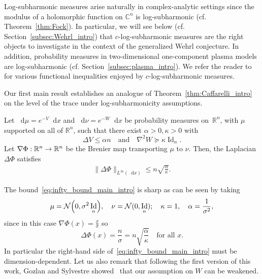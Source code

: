 \documentclass[AHL,Unicode,longabstracts]{cedram}
\newcommand{\R}{\mathbb R}
\newcommand{\C}{\mathbb C}
\DeclareMathOperator{\Id}{Id}
\newcommand{\V}{V}
\newcommand{\W}{W}
\newcommand{\dd}{n}
\newcommand{\conv}{c}
\newcommand{\source}{\mu}
\newcommand{\target}{\nu}
\newcommand{\lsh}{\alpha}
\newcommand{\lc}{\kappa}
\newcommand*\diff{\mathop{}\!\mathrm{d}}
\newcommand{\clN}{\mathcal{N}}
\newcommand{\OT}{\Phi}
\renewcommand*{\to}{\mathchoice{\longrightarrow}{\rightarrow}{\rightarrow}{\rightarrow}}
\let\originalleft\left
\let\originalright\right
\renewcommand{\left}{\mathopen{}\mathclose\bgroup\originalleft}
\renewcommand{\right}{\aftergroup\egroup\originalright}
\begin{document}
Log-subharmonic measures arise naturally in complex-analytic settings since the modulus of a holomorphic function on $\C^{\dd}$ is log-subharmonic (cf. Theorem~\ref{thm:Fock}). In particular, we will see below (cf. Section~\ref{subsec:Wehrl_intro}) that $\conv$-log-subharmonic measures are the right objects to investigate in the context of the generalized Wehrl conjecture. In addition, probability measures in two-dimensional one-component plasma models are log-subharmonic (cf. Section~\ref{subsec:plasma_intro}). We refer the reader to~\cite{MR4632741,MR2134401, MR2578455, MR3415657} for various functional inequalities enjoyed by $\conv$-log-subharmonic measures.


Our first main result establishes an analogue of Theorem~\ref{thm:Caffarelli_intro} on the level of the trace under log-subharmonicity assumptions.
\begin{theo}\label{thm:main_OT_Lp_intro}
Let $\diff\source=e^{-\V}\diff x$ and $\diff\target=e^{-\W}\diff x$ be probability measures on~$\R^{\dd}$, with $\source$ supported on all of $\R^{\dd}$, such that there exist $\lsh>0,\lc>0$ with
\[
\Delta \V \le \lsh\dd \quad\text{and}\quad \nabla^2\W \succeq \lc \Id_{\dd}.
\]
Let $\nabla\OT:\R^{\dd}\to\R^{\dd}$ be the Brenier map transporting $\source$ to $\target$. Then, the Laplacian $\Delta\OT$ satisfies
\begin{align}\label{eq:infty_bound_main_intro}
\|\Delta\OT\|_{L^{\infty}(\diff x)}\le \dd\sqrt{ \frac{\lsh}{\lc}}.
\end{align}
\end{theo}

The bound~\eqref{eq:infty_bound_main_intro} is sharp as can be seen by taking
\[
\source=\clN\left(0,\sigma^2\Id_{\dd}\right),\quad \target=\clN(0,\Id_{\dd}); \quad \lc=1, \quad \lsh=\frac{1}{\sigma^2},
\]
since in this case $\nabla \OT(x)=\frac{x}{\sigma}$ so
\[
\Delta\OT(x)=\frac{\dd}{\sigma}=\dd\sqrt{\frac{\lsh}{\lc}}\quad \text{for all }x.
\]
In particular the right-hand side of~\eqref{eq:infty_bound_main_intro} must be dimension-dependent. Let us also remark that following the first version of this work, Gozlan and Sylvestre showed~\cite[\S 6]{gozlan2025global} that our assumption on $\W$ can be weakened.
\end{document}
